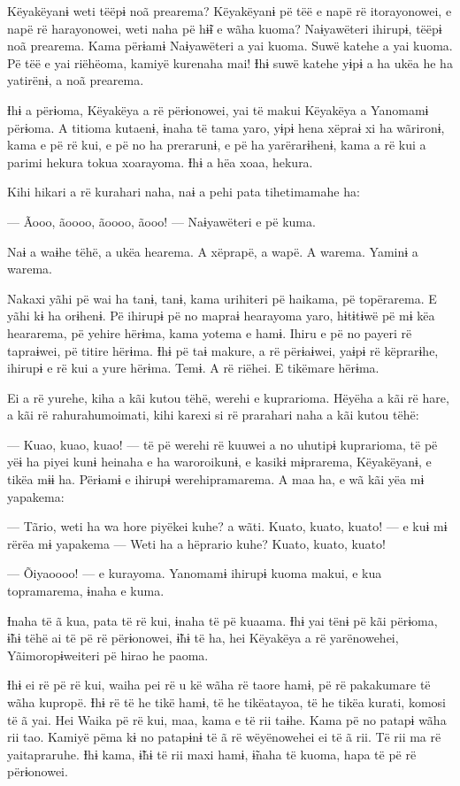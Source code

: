 Këyakëyanɨ weti tëëpɨ noã prearema? Këyakëyanɨ pë tëë e napë rë
itorayonowei, e napë rë harayonowei, weti naha pë hɨ̃ɨ e wãha kuoma?
Naɨyawëteri ihirupɨ, tëëpɨ noã prearema. Kama përɨamɨ Naɨyawëteri a yai
kuoma. Suwë katehe a yai kuoma. Pë tëë e yai riëhëoma, kamiyë kurenaha
mai! Ɨhɨ suwë katehe yɨpɨ a ha ukëa he ha yatirënɨ, a noã prearema. 

Ɨhɨ a përɨoma, Këyakëya a rë përɨonowei, yai të makui Këyakëya a
Yanomamɨ përɨoma. A titioma kutaenɨ, ɨnaha të tama yaro, yɨpɨ hena
xëpraɨ xi ha wãrironɨ, kama e pë rë kui, e pë no ha prerarunɨ, e pë ha
yarërarɨhenɨ, kama a rë kui a parimi hekura tokua xoarayoma. Ɨhɨ a hëa
xoaa, hekura. 

Kihi hikari a rë kurahari naha, naɨ a pehi pata tihetimamahe ha:

--- Ãooo, ãoooo, ãoooo, ãooo! --- Naɨyawëteri e pë kuma. 

Naɨ a waɨhe tëhë, a ukëa hearema. A xëprapë, a wapë. A warema. Yaminɨ a
warema. 

Nakaxi yãhi pë wai ha tanɨ, tanɨ, kama urihiteri pë haikama, pë
topërarema. E yãhi kɨ ha orɨhenɨ. Pë ihirupɨ pë no mapraɨ hearayoma
yaro, hɨtɨtɨwë pë mɨ këa heararema, pë yehire hërɨma, kama yotema e
hamɨ. Ihiru e pë no payeri rë tapraɨwei, pë titire hërɨma. Ɨhɨ pë taɨ
makure, a rë përɨaɨwei, yaɨpɨ rë këprarɨhe, ihirupɨ e rë kui a yure
hërɨma. Temɨ. A rë riëhei. E tikëmare hërɨma. 

Ei a rë yurehe, kiha a kãi kutou tëhë, werehi e kuprarioma. Hëyëha a kãi
rë hare, a kãi rë rahurahumoimati, kihi karexi si rë prarahari naha a
kãi kutou tëhë: 

--- Kuao, kuao, kuao! --- të pë werehi rë kuuwei a no uhutipɨ
kuprarioma, të pë yëɨ ha piyei kunɨ heinaha e ha waroroikunɨ, e kasikɨ
mɨprarema, Këyakëyanɨ, e tikëa mɨɨ ha. Përɨamɨ e ihirupɨ
werehipramarema. A maa ha, e wã kãi yëa mɨ yapakema: 

--- Tãrio, weti ha wa hore piyëkei kuhe? a wãti. Kuato, kuato, kuato!
--- e kuɨ mɨ rërëa mɨ yapakema --- Weti ha a hëprario kuhe? Kuato,
kuato, kuato! 

--- Õiyaoooo! --- e kurayoma. Yanomamɨ ihirupɨ kuoma makui, e kua
topramarema, ɨnaha e kuma. 

Ɨnaha të ã kua, pata të rë kui, ɨnaha të pë kuaama. Ɨhɨ yai tënɨ pë kãi
përɨoma, ɨ̃hɨ tëhë ai të pë rë përɨonowei, ɨ̃hɨ të ha, hei Këyakëya a rë
yarënowehei, Yãimoropɨweiteri pë hirao he paoma. 

Ɨhɨ ei rë pë rë kui, waiha pei rë u kë wãha rë taore hamɨ, pë rë
pakakumare të wãha kupropë. Ɨhɨ rë të he tikë hamɨ, të he tikëatayoa, të
he tikëa kurati, komosi të ã yai. Hei Waika pë rë kui, maa, kama e të
rii taɨhe. Kama pë no patapɨ wãha rii tao. Kamiyë pëma kɨ no patapɨnɨ të
ã rë wëyënowehei ei të ã rii. Të rii ma rë yaitapraruhe. Ɨhɨ kama, ɨ̃hɨ
të rii maxi hamɨ, ɨ̃naha të kuoma, hapa të pë rë përɨonowei. 

